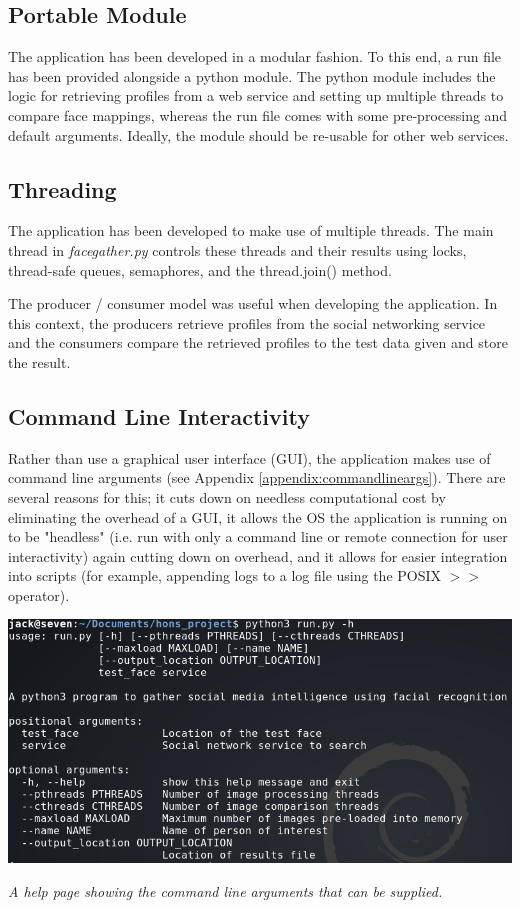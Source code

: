 \documentclass[12pt]{article}
\begin{document}
\subsection{Portable Module}
The application has been developed in a modular fashion. To this end, a run file has been provided alongside a python module. The python module includes the logic for retrieving profiles from a web service and setting up multiple threads to compare face mappings, whereas the run file comes with some pre-processing and default arguments. Ideally, the module should be re-usable for other web services.

\subsection{Threading}
The application has been developed to make use of multiple threads. The main thread in \textit{facegather.py} controls these threads and their results using locks, thread-safe queues, semaphores, and the thread.join() method.

The producer / consumer model was useful when developing the application. In this context, the producers retrieve profiles from the social networking service and the consumers compare the retrieved profiles to the test data given and store the result.

\subsection{Command Line Interactivity}
Rather than use a graphical user interface (GUI), the application makes use of command line arguments (see Appendix \ref{appendix:commandlineargs}). There are several reasons for this; it cuts down on needless computational cost by eliminating the overhead of a GUI, it allows the OS the application is running on to be "headless" (i.e. run with only a command line or remote connection for user interactivity) again cutting down on overhead, and it allows for easier integration into scripts (for example, appending logs to a log file using the POSIX $>>$ operator).

\begin{center}
\includegraphics[width=\linewidth]{res/facegather_cmd_line_args.png}

\textit{A help page showing the command line arguments that can be supplied.}
\end{center}
\end{document}

